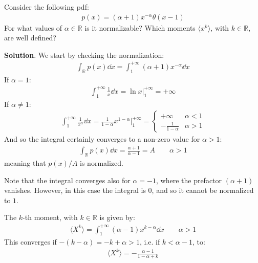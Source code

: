 \documentclass[../template.tex]{subfiles}
\begin{document}
\begin{exo}
    Consider the following pdf:
    \begin{align*}
        p(x) = (\alpha + 1) x^{-\alpha} \theta(x-1)
    \end{align*}
    For what values of $\alpha \in \mathbb{R}$ is it normalizable? Which moments $\langle x^k \rangle$, with $k \in \mathbb{R}$, are well defined?

    \medskip

    \textbf{Solution}. We start by checking the normalization:
    \begin{align*}
        \int_{\mathbb{R}} p(x) \dd{x} = \int_1^{+\infty} (\alpha + 1) x^{-\alpha} \dd{x}
    \end{align*} 
    If $\alpha =1$:
    \begin{align*}
        \int_{1}^{+\infty} \frac{1}{x} \dd{x} = \ln x \Big|_1^{+\infty} = +\infty 
    \end{align*}
    If $\alpha \neq 1$:
    \begin{align*}
        \int_1^{+\infty} \frac{1}{x^\alpha} \dd{x} = \frac{1}{1 - \alpha} x^{1 - \alpha} \Big|_{1}^{+\infty} = \begin{cases}
            +\infty & \alpha < 1\\
            -\frac{1}{1-\alpha} & \alpha > 1
        \end{cases}
    \end{align*}
    And so the integral certainly converges to a non-zero value for $\alpha > 1$:
    \begin{align*}
        \int_{\mathbb{R}} p(x) \dd{x} = \frac{\alpha+1}{\alpha-1} = A  \qquad \alpha > 1
    \end{align*}
    meaning that $p(x)/A$ is normalized.

    \medskip

    Note that the integral converges also for $\alpha = -1$, where the prefactor $(\alpha + 1)$ vanishes. However, in this case the integral is $0$, and so it cannot be normalized to $1$.

    \medskip

    The $k$-th moment, with $k \in \mathbb{R}$ is given by:
    \begin{align*}
        \langle X^k \rangle = \int_1^{+\infty} (\alpha-1) x^{k - \alpha} \dd{x} \qquad \alpha > 1
    \end{align*}
    This converges if $-(k-\alpha) = -k + \alpha > 1$, i.e. if $k < \alpha-1$, to:
    \begin{align*}
        \langle X^k \rangle = -\frac{\alpha -1}{1-\alpha +k} 
    \end{align*}
\end{exo}
\end{document}
